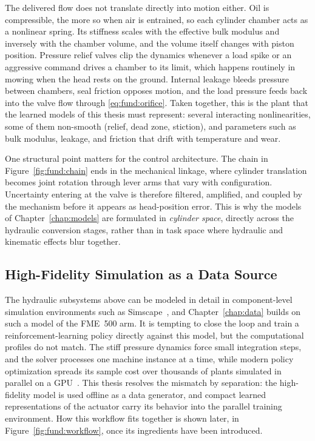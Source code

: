 The delivered flow does not translate directly into motion either. Oil
is compressible, the more so when air is entrained, so each cylinder
chamber acts as a nonlinear spring. Its stiffness scales with the
effective bulk modulus and inversely with the chamber volume, and the
volume itself changes with piston position. Pressure relief valves clip
the dynamics whenever a load spike or an aggressive command drives a
chamber to its limit, which happens routinely in mowing when the head
rests on the ground. Internal leakage bleeds pressure between chambers,
seal friction opposes motion, and the load pressure feeds back into the
valve flow through \eqref{eq:fund:orifice}. Taken together, this is the
plant that the learned models of this thesis must represent: several
interacting nonlinearities, some of them non-smooth (relief, dead zone,
stiction), and parameters such as bulk modulus, leakage, and friction
that drift with temperature and wear.

One structural point matters for the control architecture. The chain in
Figure~\ref{fig:fund:chain} ends in the mechanical linkage, where
cylinder translation becomes joint rotation through lever arms that vary
with configuration. Uncertainty entering at the valve is therefore
filtered, amplified, and coupled by the mechanism before it appears as
head-position error. This is why the models of Chapter~\ref{chap:models}
are formulated in \emph{cylinder space}, directly across the hydraulic
conversion stages, rather than in task space where hydraulic and
kinematic effects blur together.

\subsection{High-Fidelity Simulation as a Data Source}
\label{sec:fund:sim-data-source}

The hydraulic subsystems above can be modeled in detail in
component-level simulation environments such as
Simscape~\cite{mathworks2024simscape}, and Chapter~\ref{chap:data} builds
on such a model of the FME~500 arm. It is tempting to close the loop and
train a reinforcement-learning policy directly against this model, but
the computational profiles do not match. The stiff pressure dynamics
force small integration steps, and the solver processes one machine
instance at a time, while modern policy optimization spreads its sample
cost over thousands of plants simulated in parallel on a
GPU~\cite{makoviychuk2021isaac}. This thesis resolves
the mismatch by separation: the high-fidelity model is used offline as a
data generator, and compact learned representations of the actuator
carry its behavior into the parallel training environment. How this
workflow fits together is shown later, in
Figure~\ref{fig:fund:workflow}, once its ingredients have been
introduced.

